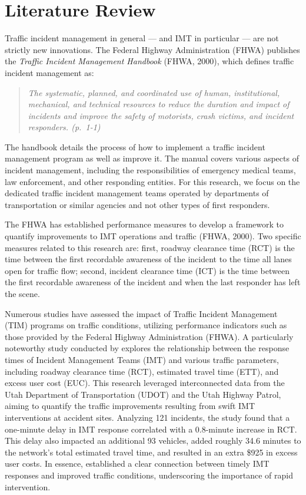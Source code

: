 \documentclass[
  letterpaper,
  authoryear]{elsarticle}
\begin{document}
\hypertarget{sec-literature}{%
\section{Literature Review}\label{sec-literature}}

Traffic incident management in general --- and IMT in particular --- are
not strictly new innovations. The Federal Highway Administration (FHWA)
publishes the \emph{Traffic Incident Management Handbook} (FHWA, 2000),
which defines traffic incident management as:

\begin{quote}
\emph{The systematic, planned, and coordinated use of human,
institutional, mechanical, and technical resources to reduce the
duration and impact of incidents and improve the safety of motorists,
crash victims, and incident responders. (p.~1-1)}
\end{quote}

The handbook details the process of how to implement a traffic incident
management program as well as improve it. The manual covers various
aspects of incident management, including the responsibilities of
emergency medical teams, law enforcement, and other responding entities.
For this research, we focus on the dedicated traffic incident management
teams operated by departments of transportation or similar agencies and
not other types of first responders.

The FHWA has established performance measures to develop a framework to
quantify improvements to IMT operations and traffic (FHWA, 2000). Two
specific measures related to this research are: first, roadway clearance
time (RCT) is the time between the first recordable awareness of the
incident to the time all lanes open for traffic flow; second, incident
clearance time (ICT) is the time between the first recordable awareness
of the incident and when the last responder has left the scene.

Numerous studies have assessed the impact of Traffic Incident Management
(TIM) programs on traffic conditions, utilizing performance indicators
such as those provided by the Federal Highway Administration (FHWA). A
particularly noteworthy study conducted by \citet{schultz2019} explores
the relationship between the response times of Incident Management Teams
(IMT) and various traffic parameters, including roadway clearance time
(RCT), estimated travel time (ETT), and excess user cost (EUC). This
research leveraged interconnected data from the Utah Department of
Transportation (UDOT) and the Utah Highway Patrol, aiming to quantify
the traffic improvements resulting from swift IMT interventions at
accident sites. Analyzing 121 incidents, the study found that a
one-minute delay in IMT response correlated with a 0.8-minute increase
in RCT. This delay also impacted an additional 93 vehicles, added
roughly 34.6 minutes to the network's total estimated travel time, and
resulted in an extra \$925 in excess user costs. In essence,
\citet{schultz2019} established a clear connection between timely IMT
responses and improved traffic conditions, underscoring the importance
of rapid intervention.
\end{document}
